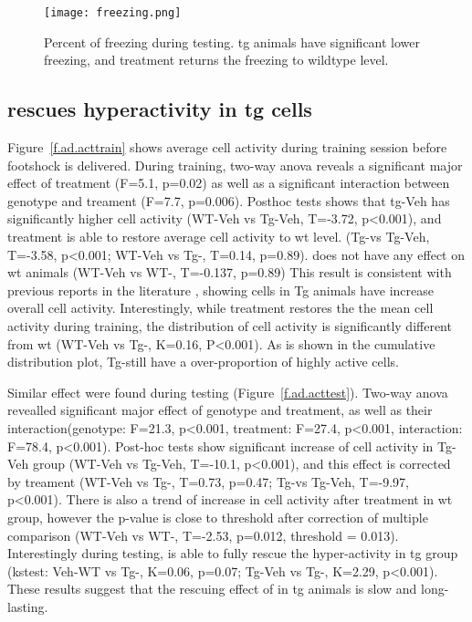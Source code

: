 \begin{figure}[h]
    \texttt{[image: freezing.png]}
    \caption{Percent of freezing during testing. \Gls{tg} animals have significant lower freezing, and \tglu treatment returns the freezing to wildtype level. \label{f.ad.freezing}}
\end{figure}



\subsection{\tglu rescues hyperactivity in \gls{tg} cells}

Figure~\ref{f.ad.acttrain} shows average cell activity during training session before footshock is delivered. During training, two-way \gls{anova} reveals a significant major effect of treatment (F=5.1, p=0.02) as well as a significant interaction between genotype and treament (F=7.7, p=0.006). Posthoc tests shows that \gls{tg}-Veh has significantly higher cell activity (WT-Veh vs Tg-Veh, T=-3.72, p<0.001), and \tglu treatment is able to restore average cell activity to \gls{wt} level. (Tg-\tglu vs Tg-Veh, T=-3.58, p<0.001; WT-Veh vs Tg-\tglu, T=0.14, p=0.89). \tglu does not have any effect on \gls{wt} animals (WT-Veh vs WT-\tglu, T=-0.137, p=0.89) This result is consistent with previous reports in the literature \citep{verret12}, showing cells in Tg animals have increase overall cell activity. Interestingly, while \tglu treatment restores the the mean cell activity during training, the distribution of cell activity is significantly different from \gls{wt} (WT-Veh vs Tg-\tglu, K=0.16, P<0.001). As is shown in the cumulative distribution plot, Tg-\tglu still have a over-proportion of highly active cells. 

Similar effect were found during testing (Figure~\ref{f.ad.acttest}). Two-way \gls{anova} revealled significant major effect of genotype and treatment, as well as their interaction(genotype: F=21.3, p<0.001, treatment: F=27.4, p<0.001, interaction: F=78.4, p<0.001). Post-hoc tests show significant increase of cell activity in Tg-Veh group (WT-Veh vs Tg-Veh, T=-10.1, p<0.001), and this effect is corrected by \tglu treament (WT-Veh vs Tg-\tglu, T=0.73, p=0.47; Tg-\tglu vs Tg-Veh, T=-9.97, p<0.001). There is also a trend of increase in cell activity after \tglu treatment in \gls{wt} group, however the p-value is close to threshold after correction of multiple comparison (WT-Veh vs WT-\tglu, T=-2.53, p=0.012, threshold = 0.013). Interestingly during testing, \tglu is able to fully rescue the hyper-activity in \gls{tg} group (\gls{kstest}: Veh-WT vs Tg-\tglu, K=0.06, p=0.07; Tg-Veh vs Tg-\tglu, K=2.29, p<0.001). These results suggest that the rescuing effect of \tglu in \gls{tg} animals is slow and long-lasting.

